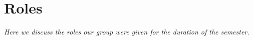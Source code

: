 \chapter{Roles} \label{ChapRoles}
\textit{Here we discuss the roles our group were given for the duration of the semester.}

%
%
